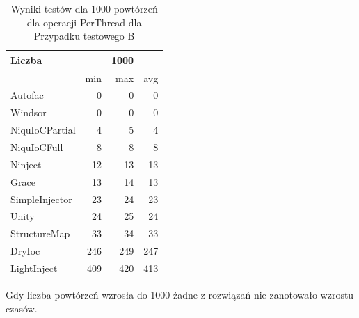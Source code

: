 \documentclass[12pt]{article}
\begin{document}
\begin{table}[H]
\captionsetup{belowskip=0pt,aboveskip=0pt}
\begin{center}
\begin{small}
	\begin{tabular}{ | l | r r r | }
    		\hline
Liczba & & 1000 & \\ \hline
 & min & max & avg \\ \hline
Autofac & 0 & 0 & 0 \\ \hline
Windsor & 0 & 0 & 0 \\ \hline
NiquIoCPartial & 4 & 5 & 4 \\ \hline
NiquIoCFull & 8 & 8 & 8 \\ \hline
Ninject & 12 & 13 & 13 \\ \hline
Grace & 13 & 14 & 13 \\ \hline
SimpleInjector & 23 & 24 & 23 \\ \hline
Unity & 24 & 25 & 24 \\ \hline
StructureMap & 33 & 34 & 33 \\ \hline
DryIoc & 246 & 249 & 247 \\ \hline
LightInject & 409 & 420 & 413 \\ \hline
  	\end{tabular}
\end{small}
\end{center}
\caption{Wyniki testów dla 1000 powtórzeń dla operacji PerThread dla Przypadku testowego B}
\label{TestCaseB_PerThread1000}
\end{table}
Gdy liczba powtórzeń wzrosła do 1000 żadne z rozwiązań nie zanotowało wzrostu czasów.
\end{document}
